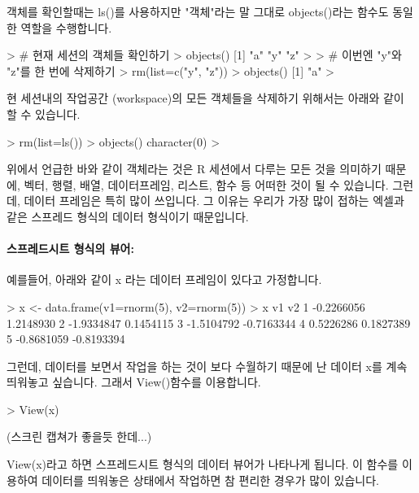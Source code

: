 \documentclass[tutorial.tex]{subfiles}
\begin{document}
객체를 확인할때는 ls()를 사용하지만 "객체"라는 말 그대로 objects()라는 함수도 동일한 역할을 수행합니다. 

\begin{Schunk}
\begin{Soutput}
	
> # 현재 세션의 객체들 확인하기 
> objects()
[1] "a" "y" "z"
>
> # 이번엔 "y"와 "z"를 한 번에 삭제하기 
> rm(list=c("y", "z"))
> objects()
[1] "a"
> 
\end{Soutput}
\end{Schunk}

현 세션내의 작업공간 (workspace)의 모든 객체들을 삭제하기 위해서는 아래와 같이 할 수 있습니다. 

\begin{Schunk}
\begin{Soutput}
> rm(list=ls())
> objects()
character(0)
> 
\end{Soutput}
\end{Schunk}

위에서 언급한 바와 같이 객체라는 것은 R 세션에서 다루는 모든 것을 의미하기 때문에, 벡터, 행렬, 배열, 데이터프레임, 리스트, 함수 등 어떠한  것이 될 수 있습니다. 
그런데, 데이터 프레임은 특히 많이 쓰입니다. 
그 이유는 우리가 가장 많이 접하는 엑셀과 같은 스프레드 형식의 데이터 형식이기 때문입니다.

\paragraph{스프레드시트 형식의 뷰어:}
예를들어, 아래와 같이 x 라는 데이터 프레임이 있다고 가정합니다. 


\begin{Schunk}
\begin{Soutput}
> x <- data.frame(v1=rnorm(5), v2=rnorm(5))
> x
          v1         v2
1 -0.2266056  1.2148930
2 -1.9334847  0.1454115
3 -1.5104792 -0.7163344
4  0.5226286  0.1827389
5 -0.8681059 -0.8193394
\end{Soutput}
\end{Schunk}

그런데, 데이터를 보면서 작업을 하는 것이 보다 수월하기 때문에 난 데이터 x를 계속 띄워놓고 싶습니다.
그래서 View()함수를 이용합니다.
\begin{Schunk}
\begin{Soutput}
> View(x)
\end{Soutput}
\end{Schunk}
(스크린 캡쳐가 좋을듯 한데...)

View(x)라고 하면 스프레드시트 형식의 데이터 뷰어가 나타나게 됩니다. 
이 함수를 이용하여 데이터를 띄워놓은 상태에서 작업하면 참 편리한 경우가 많이 있습니다.
\end{document}
